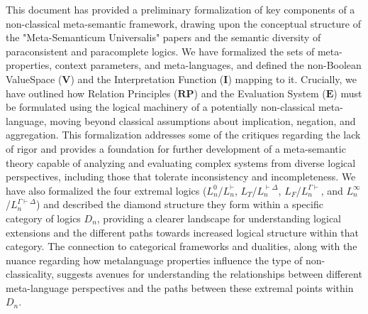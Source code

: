 \documentclass{article}
\newcommand{\InterpFunc}{\mathbf{I}}
\newcommand{\RelPrinciples}{\mathbf{RP}}
\newcommand{\EvalSystem}{\mathbf{E}}
\newcommand{\ValueSpace}{\mathbf{V}}
\newcommand{\LT}{L_T} %
\newcommand{\LF}{L_F} %
\begin{document}
																																																																																					\RaggedRight %
																																																																																					This document has provided a preliminary formalization of key components of a non-classical meta-semantic framework, drawing upon the conceptual structure of the "Meta-Semanticum Universalis" papers and the semantic diversity of paraconsistent and paracomplete logics. We have formalized the sets of meta-properties, context parameters, and meta-languages, and defined the non-Boolean ValueSpace ($\ValueSpace$) and the Interpretation Function ($\InterpFunc$) mapping to it. Crucially, we have outlined how Relation Principles ($\RelPrinciples$) and the Evaluation System ($\EvalSystem$) must be formulated using the logical machinery of a potentially non-classical meta-language, moving beyond classical assumptions about implication, negation, and aggregation. This formalization addresses some of the critiques regarding the lack of rigor and provides a foundation for further development of a meta-semantic theory capable of analyzing and evaluating complex systems from diverse logical perspectives, including those that tolerate inconsistency and incompleteness. We have also formalized the four extremal logics ($L^0_n$/$L^{\vdash}_n$, $\LT$/$L^{\vdash\Delta}_n$, $\LF$/$L^{\Gamma\vdash}_n$, and $L^\infty_n$/$L^{\Gamma\vdash\Delta}_n$) and described the diamond structure they form within a specific category of logics $D_n$, providing a clearer landscape for understanding logical extensions and the different paths towards increased logical structure within that category. The connection to categorical frameworks and dualities, along with the nuance regarding how metalanguage properties influence the type of non-classicality, suggests avenues for understanding the relationships between different meta-language perspectives and the paths between these extremal points within $D_n$.
																																																																																					
																																																																																				
\end{document}
